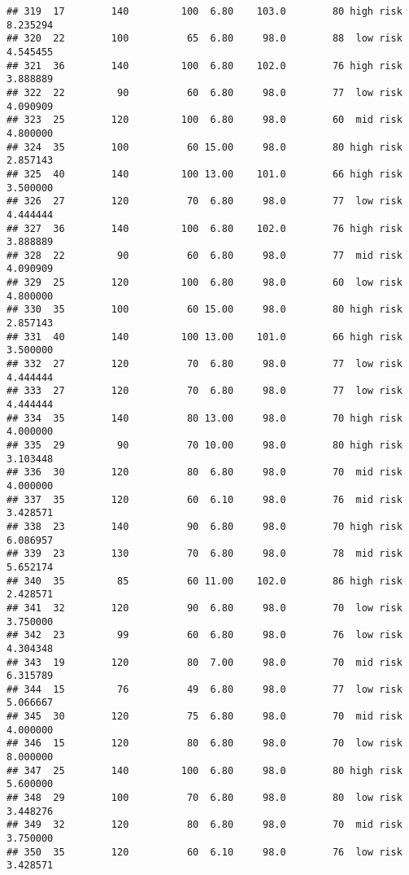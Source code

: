 \documentclass[
  ignorenonframetext,
]{beamer}
\begin{document}
\begin{frame}[fragile]
\begin{verbatim}
## 319  17        140         100  6.80    103.0        80 high risk      8.235294
## 320  22        100          65  6.80     98.0        88  low risk      4.545455
## 321  36        140         100  6.80    102.0        76 high risk      3.888889
## 322  22         90          60  6.80     98.0        77  low risk      4.090909
## 323  25        120         100  6.80     98.0        60  mid risk      4.800000
## 324  35        100          60 15.00     98.0        80 high risk      2.857143
## 325  40        140         100 13.00    101.0        66 high risk      3.500000
## 326  27        120          70  6.80     98.0        77  low risk      4.444444
## 327  36        140         100  6.80    102.0        76 high risk      3.888889
## 328  22         90          60  6.80     98.0        77  mid risk      4.090909
## 329  25        120         100  6.80     98.0        60  low risk      4.800000
## 330  35        100          60 15.00     98.0        80 high risk      2.857143
## 331  40        140         100 13.00    101.0        66 high risk      3.500000
## 332  27        120          70  6.80     98.0        77  low risk      4.444444
## 333  27        120          70  6.80     98.0        77  low risk      4.444444
## 334  35        140          80 13.00     98.0        70 high risk      4.000000
## 335  29         90          70 10.00     98.0        80 high risk      3.103448
## 336  30        120          80  6.80     98.0        70  mid risk      4.000000
## 337  35        120          60  6.10     98.0        76  mid risk      3.428571
## 338  23        140          90  6.80     98.0        70 high risk      6.086957
## 339  23        130          70  6.80     98.0        78  mid risk      5.652174
## 340  35         85          60 11.00    102.0        86 high risk      2.428571
## 341  32        120          90  6.80     98.0        70  low risk      3.750000
## 342  23         99          60  6.80     98.0        76  low risk      4.304348
## 343  19        120          80  7.00     98.0        70  mid risk      6.315789
## 344  15         76          49  6.80     98.0        77  low risk      5.066667
## 345  30        120          75  6.80     98.0        70  mid risk      4.000000
## 346  15        120          80  6.80     98.0        70  low risk      8.000000
## 347  25        140         100  6.80     98.0        80 high risk      5.600000
## 348  29        100          70  6.80     98.0        80  low risk      3.448276
## 349  32        120          80  6.80     98.0        70  mid risk      3.750000
## 350  35        120          60  6.10     98.0        76  low risk      3.428571

\end{verbatim}
\end{frame}
\end{document}
